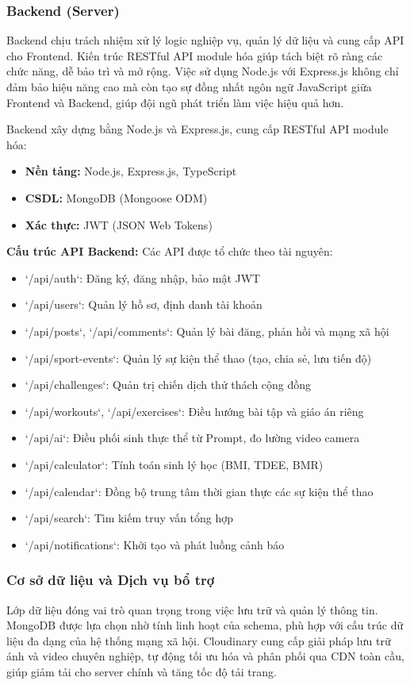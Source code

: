 \subsubsection{Backend (Server)}
\label{subsubsec:backend_component}
Backend chịu trách nhiệm xử lý logic nghiệp vụ, quản lý dữ liệu và cung cấp API cho Frontend. Kiến trúc RESTful API module hóa giúp tách biệt rõ ràng các chức năng, dễ bảo trì và mở rộng. Việc sử dụng Node.js với Express.js không chỉ đảm bảo hiệu năng cao mà còn tạo sự đồng nhất ngôn ngữ JavaScript giữa Frontend và Backend, giúp đội ngũ phát triển làm việc hiệu quả hơn.

Backend xây dựng bằng Node.js và Express.js, cung cấp RESTful API module hóa:
\begin{itemize}
    \item \textbf{Nền tảng:} Node.js, Express.js, TypeScript
    \item \textbf{CSDL:} MongoDB (Mongoose ODM)
    \item \textbf{Xác thực:} JWT (JSON Web Tokens)
\end{itemize}

\textbf{Cấu trúc API Backend:} Các API được tổ chức theo tài nguyên:
\begin{itemize}
    \item `/api/auth`: Đăng ký, đăng nhập, bảo mật JWT
    \item `/api/users`: Quản lý hồ sơ, định danh tài khoản
    \item `/api/posts`, `/api/comments`: Quản lý bài đăng, phản hồi và mạng xã hội
    \item `/api/sport-events`: Quản lý sự kiện thể thao (tạo, chia sẻ, lưu tiến độ)
    \item `/api/challenges`: Quản trị chiến dịch thử thách cộng đồng
    \item `/api/workouts`, `/api/exercises`: Điều hướng bài tập và giáo án riêng
    \item `/api/ai`: Điều phối sinh thực thể từ Prompt, đo lường video camera
    \item `/api/calculator`: Tính toán sinh lý học (BMI, TDEE, BMR)
    \item `/api/calendar`: Đồng bộ trung tâm thời gian thực các sự kiện thể thao
    \item `/api/search`: Tìm kiếm truy vấn tổng hợp
    \item `/api/notifications`: Khởi tạo và phát luồng cảnh báo
\end{itemize}

\subsubsection{Cơ sở dữ liệu và Dịch vụ bổ trợ}
\label{subsubsec:database_support_services}
Lớp dữ liệu đóng vai trò quan trọng trong việc lưu trữ và quản lý thông tin. MongoDB được lựa chọn nhờ tính linh hoạt của schema, phù hợp với cấu trúc dữ liệu đa dạng của hệ thống mạng xã hội. Cloudinary cung cấp giải pháp lưu trữ ánh và video chuyên nghiệp, tự động tối ưu hóa và phân phối qua CDN toàn cầu, giúp giảm tải cho server chính và tăng tốc độ tải trang.


